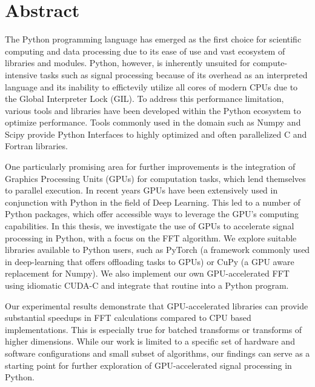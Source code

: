 \section*{Abstract}
The Python programming language has emerged as the first choice for scientific computing and data processing due to its ease of use and vast ecosystem of libraries and modules.
Python, however, is inherently unsuited for compute-intensive tasks such as signal processing because of its overhead as an interpreted language and its inability to effictevily utilize all cores of modern CPUs due to the Global Interpreter Lock (GIL).
To address this performance limitation, various tools and libraries have been developed within the Python ecosystem to optimize performance.
Tools commonly used in the domain such as Numpy and Scipy provide Python Interfaces to highly optimized and often parallelized C and Fortran libraries.

One particularly promising area for further improvements is the integration of Graphics Processing Units (GPUs) for computation tasks, which lend themselves to parallel execution.
In recent years GPUs have been extensively used in conjunction with Python in the field of Deep Learning.
This led to a number of Python packages, which offer accessible ways to leverage the GPU's computing capabilities.
In this thesis, we investigate the use of GPUs to accelerate signal processing in Python, with a focus on the FFT algorithm.
We explore suitable libraries available to Python users, such as PyTorch (a framework commonly used in deep-learning that offers offloading tasks to GPUs) or CuPy (a GPU aware replacement for Numpy).
We also implement our own GPU-accelerated FFT using idiomatic CUDA-C and integrate that routine into a Python program.

Our experimental results demonstrate that GPU-accelerated libraries can provide substantial speedups in FFT calculations compared to CPU based implementations.
This is especially true for batched transforms or transforms of higher dimensions.
While our work is limited to a specific set of hardware and software configurations and small subset of algorithms, our findings can serve as a starting point for further exploration of GPU-accelerated signal processing in Python.
\newpage
\setcounter{tocdepth}{4}
\setcounter{secnumdepth}{4}
\tableofcontents
\renewcommand{\arraystretch}{2} %

